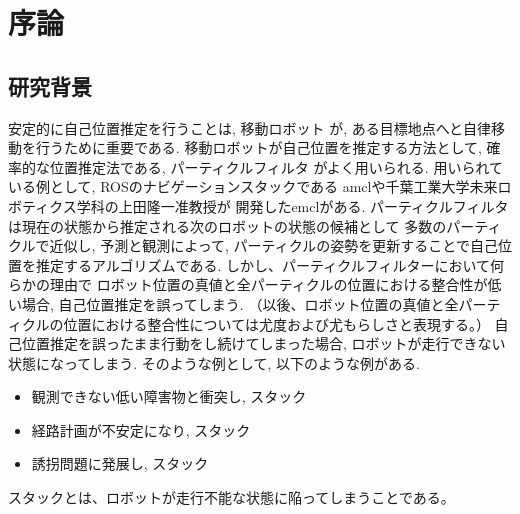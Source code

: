 \chapter{序論}

\section{研究背景}

安定的に自己位置推定を行うことは, 移動ロボット
が, ある目標地点へと自律移動を行うために重要である. 
移動ロボットが自己位置を推定する方法として,
確率的な位置推定法である, パーティクルフィルタ
がよく用いられる. 
用いられている例として, ROSのナビゲーションスタックである
amcl\cite{amcl_github}や千葉工業大学未来ロボティクス学科の上田隆一准教授が
開発したemcl\cite{emcl_github}がある. 
パーティクルフィルタは現在の状態から推定される次のロボットの状態の候補として
多数のパーティクルで近似し, 予測と観測によって,
パーティクルの姿勢を更新することで自己位置を推定するアルゴリズムである.
しかし、パーティクルフィルターにおいて何らかの理由で
ロボット位置の真値と全パーティクルの位置における整合性が低い場合, 
自己位置推定を誤ってしまう. 
（以後、ロボット位置の真値と全パーティクルの位置における整合性については尤度および尤もらしさと表現する。）
自己位置推定を誤ったまま行動をし続けてしまった場合, 
ロボットが走行できない状態になってしまう. 
そのような例として, 以下のような例がある. 

\begin{itemize}
  \item 観測できない低い障害物と衝突し, スタック
  \item 経路計画が不安定になり, スタック
  \item 誘拐問題\cite{gutmann2002etal}に発展し, スタック
\end{itemize}

\noindent
スタックとは、ロボットが走行不能な状態に陥ってしまうことである。

